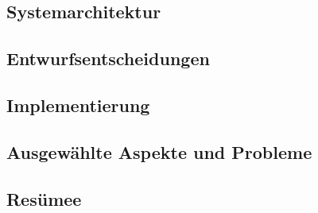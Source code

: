 \documentclass[12pt,a4paper,titlepage,listof=totoc,bibliography=totoc,chapteratlists=0pt]{scrreprt}
\begin{document}
\begin{spacing}{1}
    \chapter{Systemarchitektur}\label{chapter:system-architecture}
\end{spacing}



\begin{spacing}{1}
    \chapter{Entwurfsentscheidungen}\label{chapter:Entwurfsentscheidungen}
\end{spacing}


\begin{spacing}{1}
    \chapter{Implementierung}\label{chapter:implementation}
\end{spacing}



\begin{spacing}{1}
    \chapter{Ausgewählte Aspekte und Probleme}\label{chapter:probleme}
\end{spacing}


\begin{spacing}{1}
    \chapter{Resümee}
\end{spacing}


\newpage
{}
\setcounter{page}{\value{RPages}}

\glsnogroupskiptrue
\printglossary[title=Glossar,toctitle=Glossar] %
\listoffigures
\listoftables
\lstlistoflistings
\appendix
{}

\newpage
{}
\end{document}
